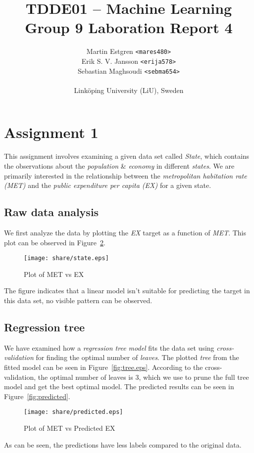 \documentclass[a4paper, twocolumn]{article}
\title{TDDE01 -- Machine Learning \\
       Group 9 Laboration Report 4}
\author{{Martin Estgren \texttt{<mares480>}} \\
        {Erik S. V. Jansson \texttt{<erija578>}} \\
        {Sebastian Maghsoudi \texttt{<sebma654>}} \\~\\
        {Linköping University (LiU), Sweden}}
\begin{document}
    \maketitle %

    \section*{Assignment 1}
    This assignment involves examining a given data set called \emph{State}, which contains the observations about the \emph{population} \& \emph{economy} in different \emph{states}. We are primarily interested in the relationship between the \emph{metropolitan habitation rate (MET)} and the \emph{public expenditure per capita (EX)} for a given state.

    \subsection{Raw data analysis}

    We first analyze the data by plotting the \emph{EX} target as a function of \emph{MET}. This plot can be observed in Figure~\ref{fig:state}.

        \begin{figure}[h!]
          \centering
          \caption{Plot of MET vs EX}
          \label{fig:state}
          \texttt{[image: share/state.eps]}
        \end{figure}

    The figure indicates that a linear model isn't suitable for predicting the target in this data set, no visible pattern can be observed.

    \subsection{Regression tree}

    We have examined how a \emph{regression tree model} fits the data set using \emph{cross-validation} for finding the optimal number of \emph{leaves}. The plotted \emph{tree} from the fitted model can be seen in Figure~\ref{fig:tree.eps}. According to the cross-validation, the optimal number of leaves is 3, which we use to prune the full tree model and get the best optimal model. The predicted results can be seen in Figure~\ref{fig:predicted}.

        \begin{figure}[h!]
          \centering
          \caption{Plot of MET vs Predicted EX}
          \label{fig:state}
          \texttt{[image: share/predicted.eps]}
        \end{figure}
        As can be seen, the predictions have less labels compared to the original data. 
\end{document}
